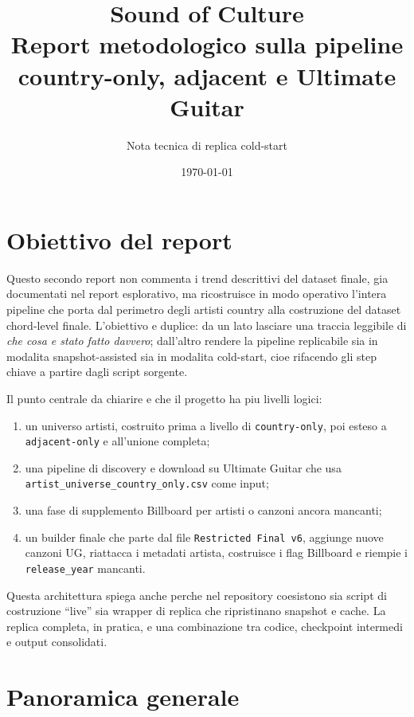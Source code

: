 \documentclass[11pt]{article}
\title{Sound of Culture\\Report metodologico sulla pipeline country-only, adjacent e Ultimate Guitar}
\author{Nota tecnica di replica cold-start}
\date{\today}
\begin{document}
\maketitle
\tableofcontents
\clearpage

\section{Obiettivo del report}
Questo secondo report non commenta i trend descrittivi del dataset finale, gia documentati nel report esplorativo, ma ricostruisce in modo operativo l'intera pipeline che porta dal perimetro degli artisti country alla costruzione del dataset chord-level finale. L'obiettivo e duplice: da un lato lasciare una traccia leggibile di \emph{che cosa e stato fatto davvero}; dall'altro rendere la pipeline replicabile sia in modalita snapshot-assisted sia in modalita cold-start, cioe rifacendo gli step chiave a partire dagli script sorgente.

Il punto centrale da chiarire e che il progetto ha piu livelli logici:
\begin{enumerate}[leftmargin=2em]
\item un universo artisti, costruito prima a livello di \texttt{country-only}, poi esteso a \texttt{adjacent-only} e all'unione completa;
\item una pipeline di discovery e download su Ultimate Guitar che usa \texttt{artist\_universe\_country\_only.csv} come input;
\item una fase di supplemento Billboard per artisti o canzoni ancora mancanti;
\item un builder finale che parte dal file \texttt{Restricted Final v6}, aggiunge nuove canzoni UG, riattacca i metadati artista, costruisce i flag Billboard e riempie i \texttt{release\_year} mancanti.
\end{enumerate}

Questa architettura spiega anche perche nel repository coesistono sia script di costruzione ``live'' sia wrapper di replica che ripristinano snapshot e cache. La replica completa, in pratica, e una combinazione tra codice, checkpoint intermedi e output consolidati.

\section{Panoramica generale}


\end{document}
